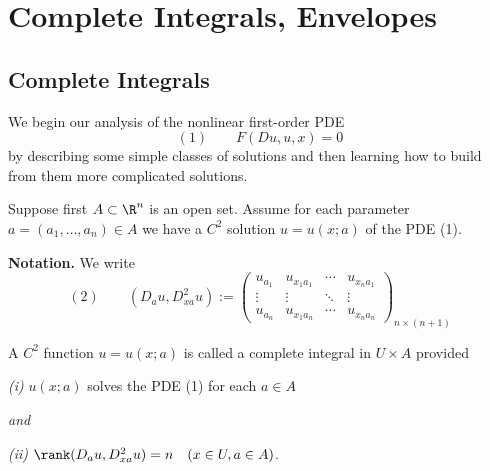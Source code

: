 \section{Complete Integrals, Envelopes}
\label{sec:complete-integrals-envelopes}

\subsection{Complete Integrals}
\label{sec:complete-integrals}

We begin our analysis of the nonlinear first-order PDE
$$(1) \qquad F(Du, u, x) = 0$$
by describing some simple classes of solutions and then learning how to build from them more complicated solutions.

Suppose first $A \subset \R^n$ is an open set. Assume for each parameter $a = (a_1, \ldots, a_n) \in A$ we have a $C^2$ solution $u = u(x; a)$ of the PDE (1).

\textbf{Notation.} We write
$$(2) \qquad (D_a u, D^2_{xa} u) := \begin{pmatrix} u_{a_1} & u_{x_1 a_1} & \cdots & u_{x_n a_1} \\ \vdots & \vdots & \ddots & \vdots \\ u_{a_n} & u_{x_1 a_n} & \cdots & u_{x_n a_n} \end{pmatrix}_{n \times (n+1)}$$

\begin{definition}
\label{def:complete-integral}
A $C^2$ function $u = u(x; a)$ is called a complete integral in $U \times A$ provided

\textit{(i)} $u(x; a)$ solves the PDE (1) for each $a \in A$

\textit{and}

\textit{(ii)} $\rank(D_a u, D^2_{xa} u) = n \quad (x \in U, a \in A)$.
\end{definition}

